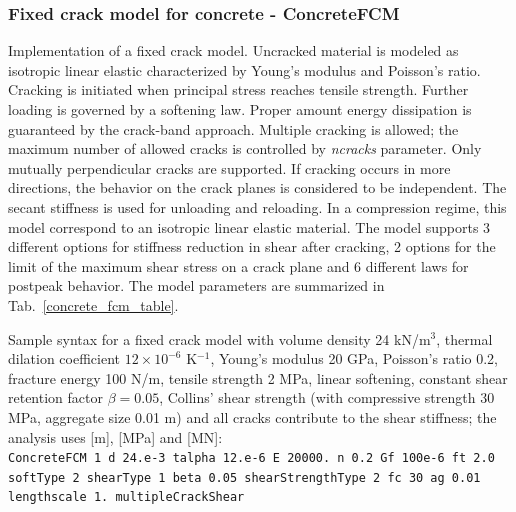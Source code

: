 \documentclass[a4paper]{article}
\newcommand{\param}[1]{{\it #1}}
\begin{document}
\subsubsection{Fixed crack model for concrete - ConcreteFCM}
\label{concreteFCM}
Implementation of a fixed crack model. Uncracked material is modeled as isotropic linear elastic characterized by Young's modulus and Poisson's ratio. 
Cracking is initiated when principal stress reaches tensile strength. Further loading is governed by a softening law. Proper amount energy dissipation is guaranteed by the crack-band approach.
Multiple cracking is allowed; the maximum number of allowed cracks is controlled by \param{ncracks} parameter. Only mutually perpendicular cracks are supported. If cracking occurs in more directions, the behavior on the crack planes is considered to be independent.
The secant stiffness is used for unloading and reloading. In a compression regime, this model correspond to an isotropic linear elastic material.
The model supports 3 different options for stiffness reduction in shear after cracking, 2 options for the limit of the maximum shear stress on a crack plane and 6 different laws for postpeak behavior. The model parameters are summarized in Tab.~\ref{concrete_fcm_table}.

Sample syntax for a fixed crack model with volume density 24 kN/m$^3$, thermal dilation coefficient $12\times10^{-6}$ K$^{-1}$, Young's modulus 20 GPa, Poisson's ratio 0.2, fracture energy 100 N/m, tensile strength 2 MPa, linear softening, constant shear retention factor $\beta = 0.05$, Collins' shear strength (with compressive strength 30 MPa, aggregate size 0.01 m) and all cracks contribute to the shear stiffness; the analysis uses [m], [MPa] and [MN]:\\
\texttt{ConcreteFCM 1 d 24.e-3 talpha 12.e-6 E 20000.~n 0.2 Gf 100e-6 ft 2.0 softType 2 shearType 1 beta 0.05 shearStrengthType 2 fc 30 ag 0.01\\ lengthscale 1.~multipleCrackShear}
\end{document}
